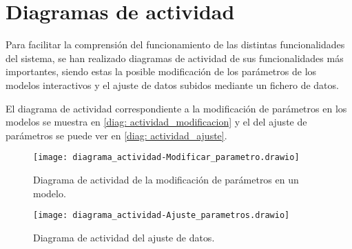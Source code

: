 \clearpage

\section{Diagramas de actividad}

Para facilitar la comprensión del funcionamiento de las distintas funcionalidades del sistema, se han realizado diagramas de actividad de sus funcionalidades más importantes, siendo estas la posible modificación de los parámetros de los modelos interactivos y el ajuste de datos subidos mediante un fichero de datos.

El diagrama de actividad correspondiente a la modificación de parámetros en los modelos se muestra en \eqref{diag: actividad_modificacion} y el del ajuste de parámetros se puede ver en \eqref{diag: actividad_ajuste}.

\begin{figure}[!h]
\begin{center}
\caption{Diagrama de actividad de la modificación de parámetros en un modelo.}
\label{diag: actividad_modificacion}
\texttt{[image: diagrama\_actividad-Modificar\_parametro.drawio]}
\end{center}
\end{figure}

\begin{figure}[!h]
\begin{center}
\caption{Diagrama de actividad del ajuste de datos.}
\label{diag: actividad_ajuste}
\texttt{[image: diagrama\_actividad-Ajuste\_parametros.drawio]}
\end{center}
\end{figure}








